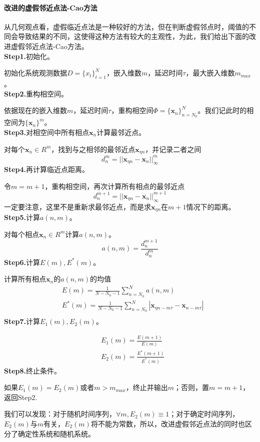             \paragraph{改进的虚假邻近点法-Cao方法}
             从几何观点看，虚假临近点法是一种较好的方法，但在判断虚假邻点时，阈值的不同会导致结果的不同，这使得这种方法有较大的主观性，为此，我们给出下面的改进虚假邻近点法-Cao方法。\\
            \textbf{Step1.}初始化。\par
            初始化系统观测数据$D=\{x_t\}_{t=1}^N$，嵌入维数$m$，延迟时间$\tau$，最大嵌入维数$m_{max}$。\\
            \textbf{Step2.}重构相空间。\par
            依据现在的嵌入维数$m$，延迟时间$\tau$，重构相空间$\Phi = \{\mathbf{x}_n\}_{n=N_0}^N$。我们记此时的相空间为$\{\mathbf{x}_n\}^m$。\\
            \textbf{Step3.}对相空间中所有相点$\mathbf{x}_n$计算最邻近点。\par
            对每个$\mathbf{x}_n \in R^m$，找到与之相邻的最邻近点$\mathbf{x}_{\eta n}$，并记录二者之间
            \[
                d_n^m = ||\mathbf{x}_{\eta n} - \mathbf{x}_n||_\infty^m
            \]
            \textbf{Step4.}再计算临近点距离。\par
            令$m = m+1$，重构相空间，再次计算所有相点的最邻近点
            \[
                d_n^{m+1} = ||\mathbf{x}_{\eta n} - \mathbf{x}_n||_\infty^{m+1}
            \]
            一定要注意，这里不是重新求最邻近点，而是求$\mathbf{x}_{\eta n}$在$m+1$情况下的距离。\\
            \textbf{Step5.}计算$a(n,m)$。\par
            对每个相点$\mathbf{x}_n \in R^m$计算$a(n,m)$。
            \[
                a(n,m) = \frac{d_n^{m+1}}{d_n^m}
            \]
            \textbf{Step6.}计算$E(m),E^*(m)$。\par
            计算所有相点$\mathbf{x}_n$的$a(n,m)$的均值
            \begin{align*}
                &E(m) = \frac{1}{N - N_0 - 1}\sum_{n = N_0}^N a(n,m) \\
                &E^*(m) = \frac{1}{N - N_0 - 1}\sum_{n = N_0}^N |\mathbf{x}_{\eta n - m\tau} - \mathbf{x}_{n - m\tau}| \\
            \end{align*}
            \textbf{Step7.}计算$E_1(m),E_2(m)$。\par
            \begin{align*}
                &E_1(m) = \frac{E(m+1)}{E(m)} \\
                &E_2(m) = \frac{E^*(m+1)}{E^*(m)}
            \end{align*}
            \textbf{Step8.}终止条件。\par
            如果$E_1(m) = E_2(m)$或者$m> m_{max}$，终止并输出$m$；否则，置$m = m+1$，返回Step2.
            \par
            我们可以发现：对于随机时间序列，$\forall m , E_2(m) \equiv 1$；对于确定时间序列，$E_2(m)$与$m$有关，$E_2(m)$将不能为常数，所以，改进虚假邻近点法的同时也区分了确定性系统和随机系统。

